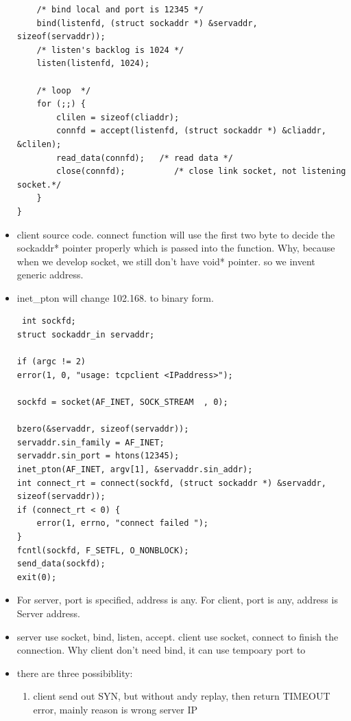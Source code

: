 \documentclass[a4paper,11pt,twoside]{book}
\begin{document}
\begin{itemize}
\begin{lstlisting}
	/* bind local and port is 12345 */
	bind(listenfd, (struct sockaddr *) &servaddr, sizeof(servaddr));
	/* listen's backlog is 1024 */
	listen(listenfd, 1024);
	
	/* loop  */
	for (;;) {
		clilen = sizeof(cliaddr);
		connfd = accept(listenfd, (struct sockaddr *) &cliaddr, &clilen);
		read_data(connfd);   /* read data */
		close(connfd);          /* close link socket, not listening socket.*/
	}
}
\end{lstlisting}

\item  client source code.  connect function will use the first two byte to decide the sockaddr* pointer properly which is passed into the function. Why, because when we develop socket, we still don't have void* pointer. so we invent generic address. 
\item  inet\_pton will change 102.168. to binary form. 
\begin{lstlisting}
 int sockfd;
struct sockaddr_in servaddr;

if (argc != 2)
error(1, 0, "usage: tcpclient <IPaddress>");

sockfd = socket(AF_INET, SOCK_STREAM  , 0);

bzero(&servaddr, sizeof(servaddr));
servaddr.sin_family = AF_INET;
servaddr.sin_port = htons(12345);
inet_pton(AF_INET, argv[1], &servaddr.sin_addr);
int connect_rt = connect(sockfd, (struct sockaddr *) &servaddr, sizeof(servaddr));
if (connect_rt < 0) {
	error(1, errno, "connect failed ");
}
fcntl(sockfd, F_SETFL, O_NONBLOCK); 
send_data(sockfd);
exit(0);                           
\end{lstlisting}

\item For server, port is specified, address is any. For client, port is any, address is Server address.
	
		\item server use socket, bind, listen, accept. client use socket, connect to finish the connection. Why client don't need bind, it can use tempoary port to 
	
	\item  there are three possibiblity:
	\begin{enumerate}
		\item client send out SYN, but without andy replay, then return TIMEOUT error, mainly reason is wrong server IP
		

\end{enumerate}
\end{itemize}
\end{document}
